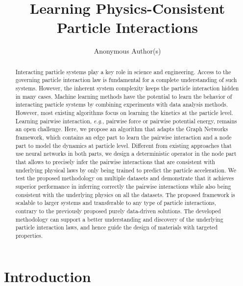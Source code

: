 \documentclass{article}
\title{Learning Physics-Consistent Particle Interactions}
\author{%
Anonymous Author(s)
}
\begin{document}
\normalem

\maketitle

\begin{abstract}
   Interacting particle systems play a key role in science and engineering. Access to the governing particle interaction law is fundamental for a complete understanding of such systems. However, the inherent system complexity keeps the particle interaction hidden in many cases. Machine learning methods have the potential to learn the behavior of interacting particle systems by combining experiments with data analysis methods. However, most existing algorithms focus on learning the kinetics at the particle level. Learning pairwise interaction, \textit{e.g.}, pairwise force or pairwise potential energy, remains an open challenge. Here, we propose an algorithm that adapts the Graph Networks framework, which contains an edge part to learn the pairwise interaction and a node part to model the dynamics at particle level. Different from existing approaches that use neural networks in both parts, we design a deterministic operator in the node part that allows to precisely infer the pairwise interactions that are consistent with underlying physical laws by only being trained to predict the particle acceleration. We test the proposed methodology on multiple datasets and demonstrate that it achieves superior performance in inferring correctly the pairwise interactions while also being consistent with the underlying physics on all the datasets. The proposed framework is scalable to larger systems and transferable to any type of particle interactions, contrary to the previously proposed purely data-driven solutions. The developed methodology can support a better understanding and discovery of the underlying particle interaction laws, and hence guide the design of materials with targeted properties.
\end{abstract}


\section{Introduction}
\label{sec:introduction}
\end{document}
